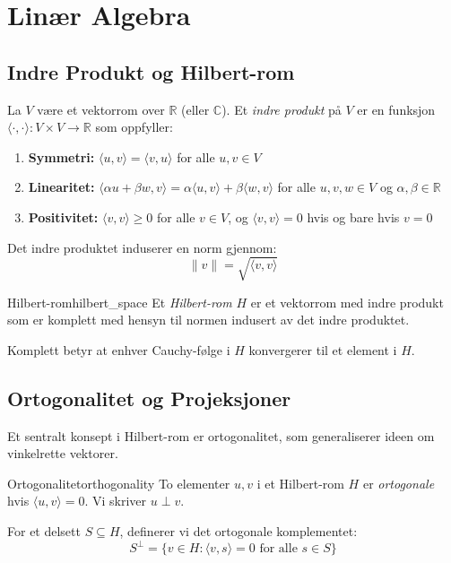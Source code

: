 \documentclass[../../main.tex]{subfiles}
\begin{document}
\section{Linær Algebra}
\label{sec:linear_algebra}

\subsection{Indre Produkt og Hilbert-rom}
La $V$ være et vektorrom over $\mathbb{R}$ (eller $\mathbb{C}$). Et \emph{indre produkt} på $V$ er en funksjon $\langle \cdot, \cdot \rangle : V \times V \to \mathbb{R}$ som oppfyller:
\begin{enumerate}
    \item \textbf{Symmetri:} $\langle u, v \rangle = \langle v, u \rangle$ for alle $u, v \in V$
    \item \textbf{Linearitet:} $\langle \alpha u + \beta w, v \rangle = \alpha \langle u, v \rangle + \beta \langle w, v \rangle$ for alle $u, v, w \in V$ og $\alpha, \beta \in \mathbb{R}$
    \item \textbf{Positivitet:} $\langle v, v \rangle \geq 0$ for alle $v \in V$, og $\langle v, v \rangle = 0$ hvis og bare hvis $v = 0$
\end{enumerate}

Det indre produktet induserer en norm gjennom:
\begin{equation}
    \|v\| = \sqrt{\langle v, v \rangle}
\end{equation}

\begin{definition}{Hilbert-rom}{hilbert_space}
    Et \emph{Hilbert-rom} $H$ er et vektorrom med indre produkt som er komplett med hensyn til normen indusert av det indre produktet.

    Komplett betyr at enhver Cauchy-følge i $H$ konvergerer til et element i $H$.
\end{definition}

\subsection{Ortogonalitet og Projeksjoner}

Et sentralt konsept i Hilbert-rom er ortogonalitet, som generaliserer ideen om vinkelrette vektorer.

\begin{definition}{Ortogonalitet}{orthogonality}
    To elementer $u, v$ i et Hilbert-rom $H$ er \emph{ortogonale} hvis $\langle u, v \rangle = 0$. Vi skriver $u \perp v$.

    For et delsett $S \subseteq H$, definerer vi det ortogonale komplementet:
    \begin{equation}
        S^\perp = \{v \in H : \langle v, s \rangle = 0 \text{ for alle } s \in S\}
    \end{equation}
\end{definition}
\end{document}
